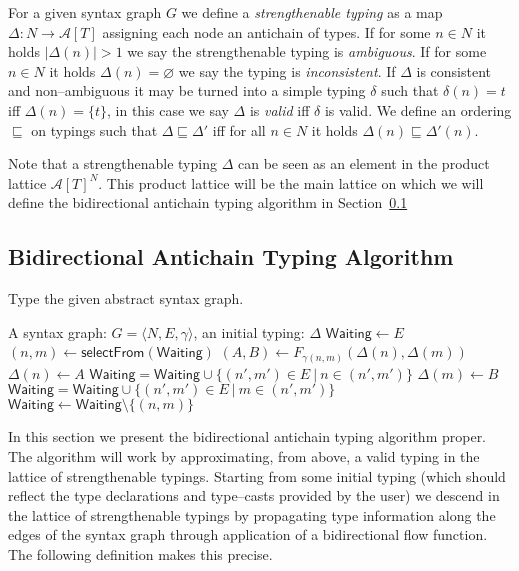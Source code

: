 \documentclass{sigplanconf}
\newcommand{\concept}[1]{\emph{#1}}
\newcommand{\ms}[1]{\mathsf{#1}}
\newcommand{\mc}[1]{\mathcal{#1}}
\newcommand{\nada}{\varnothing}
\begin{document}
\begin{definition} 
For a given syntax graph $G$ we define a \concept{strengthenable typing} as
a map $\Delta : N \to \mc{A}[T]$ assigning each node an antichain of
types. If for some $n \in N$ it holds $|\Delta(n)| > 1$ we say the
strengthenable typing is \concept{ambiguous}. If for some $n \in N$ it holds
$\Delta(n) = \nada$ we say the typing is \concept{inconsistent}. 
If $\Delta$ is consistent and non--ambiguous it may be turned into a
simple typing $\delta$ such that $\delta(n) = t$ iff $\Delta(n) = \{ t
\}$, in this case we say $\Delta$ is \emph{valid} iff $\delta$ is
valid. We define an ordering $\sqsubseteq$ on typings such that
$\Delta \sqsubseteq \Delta'$ iff for all $n \in N$ it holds $\Delta(n)
\sqsubseteq \Delta'(n)$.
\end{definition}

Note that a strengthenable typing $\Delta$ can be seen as an element
in the product lattice $\mc{A}[T]^N$. This product lattice will be the
main lattice on which we will define the bidirectional antichain
typing algorithm in Section~\ref{sec:algorithm}

\subsection{Bidirectional Antichain Typing Algorithm}\label{sec:algorithm}

\begin{algorithm}[b]
\caption{Type the given abstract syntax graph.}\label{alg:typing}
\begin{algorithmic}[1]
\REQUIRE A syntax graph: $G = \langle N, E, \gamma \rangle$, an
initial typing: $\Delta$
\STATE $\ms{Waiting} \leftarrow E$
\WHILE{$\ms{Waiting} \ne \nada$}
  \STATE $(n, m) \leftarrow \ms{selectFrom}(\ms{Waiting})$
  \STATE $(A, B) \leftarrow F_{\gamma(n, m)}(\Delta(n), \Delta(m))$
\STATE $\Delta(n) \leftarrow A$
\STATE $\ms{Waiting} = \ms{Waiting} \cup \{ (n', m') \in
    E\ |\ n \in ( n', m' ) \}$
\ENDIF
{}
\STATE $\Delta(m) \leftarrow B$
\STATE $\ms{Waiting} = \ms{Waiting} \cup \{ (n', m') \in E\ |\ m
    \in (n', m') \}$
\ENDIF
\STATE $\ms{Waiting} \leftarrow \ms{Waiting} \setminus \{ (n, m) \}$
\ENDWHILE
\end{algorithmic}
\end{algorithm}

In this section we present the bidirectional antichain typing
algorithm proper. The algorithm will work by approximating, from
above, a valid typing in the lattice of strengthenable
typings. Starting from some initial typing (which should reflect the
type declarations and type--casts provided by the user) we descend in
the lattice of strengthenable typings by propagating type information
along the edges of the syntax graph through application of a
bidirectional flow function. The following definition makes this
precise.
\end{document}

